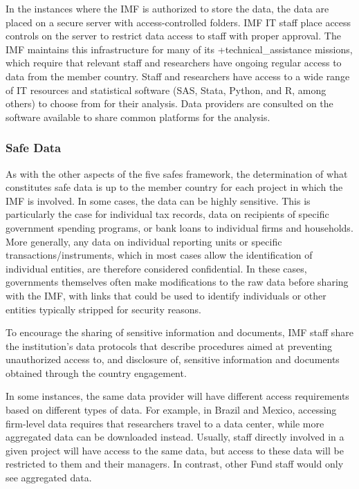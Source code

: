 \documentclass[
]{WileySix}
\begin{document}
In the instances where the IMF is authorized to store the data, the data are placed on a secure server with access-controlled folders. IMF IT staff place access controls on the server to restrict data access to staff with proper approval. The IMF maintains this infrastructure for many of its +technical\_assistance\textbar{} missions, which require that relevant staff and researchers have ongoing regular access to data from the member country. Staff and researchers have access to a wide range of IT resources and statistical software (SAS, Stata, Python, and R, among others) to choose from for their analysis. Data providers are consulted on the software available to share common platforms for the analysis.

\hypertarget{safe-data-8}{%
\subsubsection{Safe Data}\label{safe-data-8}}

As with the other aspects of the five safes framework, the determination of what constitutes safe data is up to the member country for each project in which the IMF is involved. In some cases, the data can be highly sensitive. This is particularly the case for individual tax records, data on recipients of specific government spending programs, or bank loans to individual firms and households. More generally, any data on individual reporting units or specific transactions/instruments, which in most cases allow the identification of individual entities, are therefore considered confidential. In these cases, governments themselves often make modifications to the raw data before sharing with the IMF, with links that could be used to identify individuals or other entities typically stripped for security reasons.

To encourage the sharing of sensitive information and documents, IMF staff share the institution's data protocols that describe procedures aimed at preventing unauthorized access to, and disclosure of, sensitive information and documents obtained through the country engagement.

In some instances, the same data provider will have different access requirements based on different types of data. For example, in Brazil and Mexico, accessing firm-level data requires that researchers travel to a data center, while more aggregated data can be downloaded instead. Usually, staff directly involved in a given project will have access to the same data, but access to these data will be restricted to them and their managers. In contrast, other Fund staff would only see aggregated data.
\end{document}
